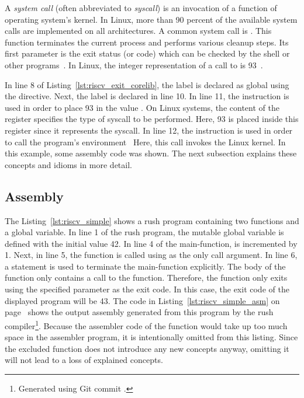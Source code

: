 
A \emph{system call} (often abbreviated to \emph{syscall}) is an invocation of a function of operating system's kernel.
In Linux, more than 90 percent of the available system calls are implemented on all architectures.
A common system call is .
This function terminates the current process and performs various cleanup steps.
Its first parameter is the exit status (or code) which can be checked by the shell or other programs~\cite[p.~148]{Love2013}.
In \riscv{} Linux, the integer representation of a call to  is 93~\cite{Torvalds1991}.

In line 8 of Listing~\ref{lst:riscv_exit_corelib}, the  label is declared as global using the  directive.
Next, the  label is declared in line 10.
In line 11, the  instruction is used in order to place 93 in the value .
On \riscv{} Linux systems, the content of the  register specifies the type of syscall to be performed.
Here, 93 is placed inside this register since it represents the  syscall.
In line 12, the  instruction is used in order to call the program's environment~\cite[p.~23]{Patterson2017}
Here, this call invokes the Linux kernel.
In this example, some \riscv{} assembly code was shown.
The next subsection explains these concepts and idioms in more detail.

\subsection{\riscv{} Assembly}

The Listing~\ref{lst:riscv_simple} shows a rush program containing two functions and a global variable.
In line 1 of the rush program, the mutable global variable  is defined with the initial value 42.
In line 4 of the main-function,  is incremented by 1.
Next, in line 5, the  function is called using  as the only call argument.
In line 6, a  statement is used to terminate the main-function explicitly.
The body of the  function only contains a call to the  function.
Therefore, the  function only exits using the specified parameter  as the exit code.
In this case, the exit code of the displayed program will be 43.
The code in Listing~\ref{lst:riscv_simple_asm} on page~\pageref{lst:riscv_simple_asm} shows the output assembly generated from this program by the rush \riscv{} compiler\footnote{Generated using Git commit \rushCommit{}.}.
Because the assembler code of the  function would take up too much space in the assembler program, it is intentionally omitted from this listing.
Since the excluded function does not introduce any new concepts anyway, omitting it will not lead to a loss of explained concepts.

